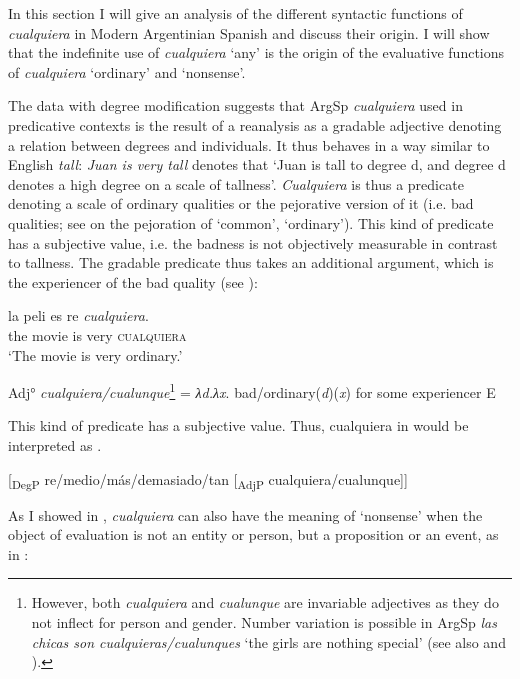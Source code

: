 In this section I will give an analysis of the different syntactic functions of \textit{cualquiera} in Modern Argentinian Spanish and discuss their origin. I will show that the indefinite use of \textit{cualquiera} ‘any’ is the origin of the evaluative functions of \textit{cualquiera} ‘ordinary’ and ‘nonsense’.

The data with degree modification suggests that ArgSp \textit{cualquiera} used in predicative contexts is the result of a reanalysis as a gradable adjective denoting a relation between degrees and individuals. It thus behaves in a way similar to English \textit{tall}: \textit{Juan is very tall} denotes that ‘Juan is tall to degree d, and degree d denotes a high degree on a scale of tallness’. \textit{Cualquiera} is thus a predicate denoting a scale of ordinary qualities or the pejorative version of it (i.e. bad qualities; see  on the pejoration of ‘common’, ‘ordinary’). This kind of predicate has a subjective value, i.e. the badness is not objectively measurable in contrast to tallness. The gradable predicate thus takes an additional argument, which is the experiencer of the bad quality (see ):

\ea \label{ex:key:217}
\ea \label{ex:key:217a} 
\gll la peli es re \textit{cualquiera}.\\
the movie is very \textsc{cualquiera}\\
\glt ‘The movie is very ordinary.’

\ex \label{ex:key:217b}
    Adj° \textit{cualquiera/cualunque}\footnote{{However, both} {\textit{cualquiera}} {and} {\textit{cualunque}} {are invariable adjectives as they do not inflect for person and gender. Number variation is possible in ArgSp} {\textit{las chicas son cualquieras/cualunques}} {‘the girls are nothing special’ (see also \citealt{Rainer1993} and ).}} = \textit{λd.λx}. bad/ordinary(\textit{d})(\textit{x}) for some experiencer E

\z 
\z

This kind of predicate has a subjective value. Thus, cualquiera in  would be interpreted as .

\ea \label{ex:key:218}
    [\textsubscript{DegP} re/medio/más/demasiado/tan [\textsubscript{AdjP} cualquiera/cualunque]]
\z

As I showed in , \textit{cualquiera} can also have the meaning of ‘nonsense’ when the object of evaluation is not an entity or person, but a proposition or an event, as in :

